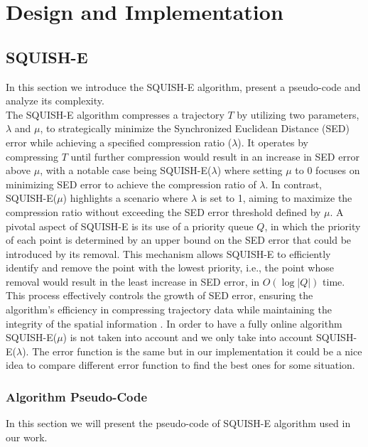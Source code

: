 
\chapter{Design and Implementation}
\section{SQUISH-E}
In this section we introduce the SQUISH-E algorithm, present a pseudo-code and analyze its complexity. \\

The SQUISH-E algorithm compresses a trajectory \(T\) by utilizing two parameters, \(\lambda\) and \(\mu\), to strategically minimize the Synchronized Euclidean Distance (SED) error while achieving a specified compression ratio (\(\lambda\)). It operates by compressing \(T\) until further compression would result in an increase in SED error above \(\mu\), with a notable case being SQUISH-E(\(\lambda\)) where setting \(\mu\) to 0 focuses on minimizing SED error to achieve the compression ratio of \(\lambda\). In contrast, SQUISH-E(\(\mu\)) highlights a scenario where \(\lambda\) is set to 1, aiming to maximize the compression ratio without exceeding the SED error threshold defined by \(\mu\). A pivotal aspect of SQUISH-E is its use of a priority queue \(Q\), in which the priority of each point is determined by an upper bound on the SED error that could be introduced by its removal. This mechanism allows SQUISH-E to efficiently identify and remove the point with the lowest priority, i.e., the point whose removal would result in the least increase in SED error, in \(O(\log |Q|)\) time. This process effectively controls the growth of SED error, ensuring the algorithm's efficiency in compressing trajectory data while maintaining the integrity of the spatial information \cite{muckell2014compression}. In order to have a fully online algorithm SQUISH-E(\(\mu\)) is not taken into account and we only take into account SQUISH-E(\(\lambda\)). The error function is the same but in our implementation it could be a nice idea to compare different error function to find the best ones for some situation.

\subsection{Algorithm Pseudo-Code}
In this section we will present the pseudo-code of SQUISH-E algorithm used in our work. \\

